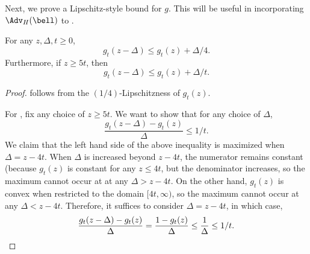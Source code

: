 Next, we prove a Lipschitz-style bound for $g$. This will be useful in incorporating $\Adv_H(\bell)$ to .
\begin{proposition}
    \label{prop:lipschitz-bounds}
    For any $z, \Delta, t \geq 0$,
    \begin{equation}
        \label{eq:lipschitz}
        g_t(z - \Delta) \leq g_t(z) + \Delta/4.
    \end{equation}
    Furthermore, if $z \geq 5t$, then
    \begin{equation}
        \label{eq:lipschitz-scaled}
        g_t(z - \Delta) \leq g_t(z) + \Delta/t.
    \end{equation}
\end{proposition}
\begin{proof}
     follows from the $(1/4)$-Lipschitzness of $g_t(z)$.

    For , fix any choice of $z \geq 5t$. We want to show that for any choice of $\Delta$,
    \begin{equation*}
        \frac{ g_t(z - \Delta) - g_t(z)}{\Delta} \leq 1/t.
    \end{equation*}
    We claim that the left hand side of the above inequality is maximized when $\Delta = z - 4t$. When $\Delta$ is increased beyond $z - 4t$, the numerator remains constant (because $g_t(z)$ is constant for any $z \leq 4t$, but the denominator increases, so the maximum cannot occur at at any $\Delta > z-4t$. On the other hand, $g_t(z)$ is convex when restricted to the domain $[4t, \infty)$, so the maximum cannot occur at any $\Delta < z - 4t$. Therefore, it suffices to consider $\Delta = z - 4t$, in which case,
    \begin{equation*}
         \frac{ g_t(z - \Delta) - g_t(z)}{\Delta} = \frac{1 - g_t(z)}{\Delta} \leq \frac{1}{\Delta} \leq 1/t. \qedhere
    \end{equation*}
\end{proof}

